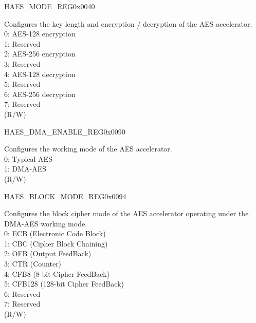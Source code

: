 \begin{register}{H}{AES\_MODE\_REG}{0x0040}\label{regdesc:AESMODEREG}
%
%
\regnewline%
\begin{regdesc}\begin{reglist}
\item [AES\_MODE] Configures the key length and encryption / decryption of the AES accelerator.\\
0: AES-128 encryption\\
1: Reserved\\
2: AES-256 encryption\\
3: Reserved\\
4: AES-128 decryption\\
5: Reserved\\
6: AES-256 decryption\\
7: Reserved\\
(R/W)
\end{reglist}\end{regdesc}
\end{register}


\begin{register}{H}{AES\_DMA\_ENABLE\_REG}{0x0090}\label{regdesc:AESDMAENABLEREG}
%
%
\regnewline%
\begin{regdesc}\begin{reglist}
\item [AES\_DMA\_ENABLE] Configures the working mode of the AES accelerator. \\
0: Typical AES\\
1: DMA-AES\\
(R/W) 
\end{reglist}\end{regdesc}
\end{register}


\begin{register}{H}{AES\_BLOCK\_MODE\_REG}{0x0094}\label{regdesc:AESBLOCKMODEREG}
%
%
\regnewline%
\begin{regdesc}\begin{reglist}
\item [AES\_BLOCK\_MODE] Configures the block cipher mode of the AES accelerator operating under the DMA-AES working mode. \\
0: ECB (Electronic Code Block)\\
1: CBC (Cipher Block Chaining)\\
2: OFB (Output FeedBack)\\
3: CTR (Counter)\\
4: CFB8 (8-bit Cipher FeedBack)\\
5: CFB128 (128-bit Cipher FeedBack)\\
6: Reserved\\
7: Reserved\\
(R/W)
\end{reglist}\end{regdesc}
\end{register}


